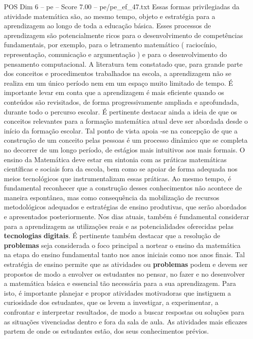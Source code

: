 \begin{textsample}{POS Dim 6 – pe – Score 7.00 – pe/pe\_ef\_47.txt}
Essas formas privilegiadas da atividade matemática são, ao mesmo tempo, objeto e estratégia para a aprendizagem ao longo de toda a educação básica.
Esses processos de aprendizagem são potencialmente ricos para o desenvolvimento de competências fundamentais, por exemplo, para o letramento matemático ( raciocínio, representação, comunicação e argumentação ) e para o desenvolvimento do pensamento computacional.
A literatura tem constatado que, para grande parte dos conceitos e procedimentos trabalhados na escola, a aprendizagem não se realiza em um único período nem em um espaço muito limitado de tempo.
É importante levar em conta que a aprendizagem é mais eficiente quando os conteúdos são revisitados, de forma progressivamente ampliada e aprofundada, durante todo o percurso escolar.
É pertinente destacar ainda a ideia de que os conceitos relevantes para a formação matemática atual deve ser abordada desde o início da formação escolar.
Tal ponto de vista apoia -se na concepção de que a construção de um conceito pelas pessoas é um processo dinâmico que se completa no decorrer de um longo período, de estágios mais intuitivos aos mais formais.
O ensino da Matemática deve estar em sintonia com as práticas matemáticas científicas e sociais fora da escola, bem como se apoiar de forma adequada nos meios tecnológicos que instrumentalizam essas práticas.
Ao mesmo tempo, é fundamental reconhecer que a construção desses conhecimentos não acontece de maneira espontânea, mas como consequência da mobilização de recursos metodológicos adequados e estratégias de ensino produtivas, que serão abordados e apresentados posteriormente.
Nos dias atuais, também é fundamental considerar para a aprendizagem as utilizações reais e as potencialidades oferecidas pelas \textbf{tecnologias} \textbf{digitais}.
É pertinente também destacar que a resolução de \textbf{problemas} seja considerada o foco principal a nortear o ensino da matemática na etapa do ensino fundamental tanto nos anos iniciais como nos anos finais.
Tal estratégia de ensino permite que as atividades ou \textbf{problemas} podem e devem ser propostos de modo a envolver os estudantes no pensar, no fazer e no desenvolver a matemática básica e essencial tão necessária para a sua aprendizagem.
Para isto, é importante planejar e propor atividades motivadoras que instiguem a curiosidade dos estudantes, que os levem a investigar, a experimentar, a confrontar e interpretar resultados, de modo a buscar respostas ou soluções para as situações vivenciadas dentro e fora da sala de aula.
As atividades mais eficazes partem de onde os estudantes estão, dos seus conhecimentos prévios.

\end{textsample}
